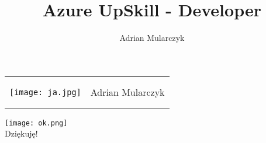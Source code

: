 \documentclass{beamer}
\title[]
{
	\Huge{Azure UpSkill - Developer}
}
\author[Adrian Mularczyk]
{
	\Large{Adrian Mularczyk}
}
\institute[PGS Software]
{
	\texttt{[image: pgs.png]}
}
\date{}
\begin{document}
\begin{frame}
  \titlepage 
\end{frame}

\begin{frame}{}
	\begin{tabular}{ p{4.4cm} p{6cm} }
		\begin{minipage}{.4\textwidth}
			\begin{center}
  				\texttt{[image: ja.jpg]}
			\end{center}
   		 \end{minipage}
   		 &
		\begin{minipage}{.7\textwidth}
  					\Huge{Adrian Mularczyk} \newline \newline
   		 \end{minipage}
	\end{tabular}
\end{frame}




\begin{frame}{}
	\begin{center}
  		\texttt{[image: ok.png]} \\
		\Huge{Dziękuję!}
	\end{center}
\end{frame}
\end{document}
